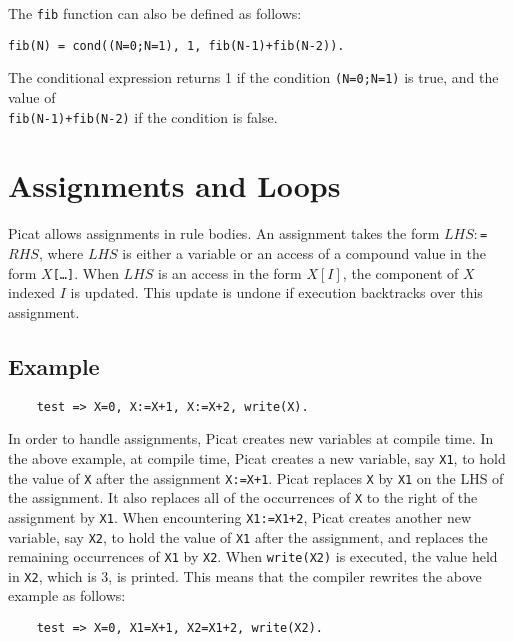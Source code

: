 The \texttt{fib} function can also be defined as follows:
\begin{verbatim}
fib(N) = cond((N=0;N=1), 1, fib(N-1)+fib(N-2)).
\end{verbatim}
The conditional expression returns 1 if the condition \texttt{(N=0;N=1)} is true, and the value of \\ \texttt{fib(N-1)+fib(N-2)} if the condition is false.

\section{Assignments and Loops}
Picat allows assignments in rule bodies. An assignment takes the form $LHS $$:$\verb+=+$ RHS$, where $LHS$ is either a variable or an access of a compound value in the form \texttt{$X$[\ldots]}. When $LHS$ is an access in the form $X[I]$, the component of $X$ indexed $I$ is updated. This update is undone if execution backtracks over this assignment.

\subsection*{Example}
\begin{verbatim}
    test => X=0, X:=X+1, X:=X+2, write(X).
\end{verbatim}

In order to handle assignments, Picat creates new variables at compile time.  In the above example, at compile time, Picat creates a new variable, say \texttt{X1}, to hold the value of \texttt{X} after the assignment \verb-X:=X+1-. Picat replaces \texttt{X} by \texttt{X1} on the LHS of the assignment.  It also replaces all of the occurrences of \texttt{X} to the right of the assignment by \texttt{X1}.  When encountering \verb-X1:=X1+2-, Picat creates another new variable, say \texttt{X2}, to hold the value of \texttt{X1} after the assignment, and replaces the remaining occurrences of \texttt{X1} by \texttt{X2}. When \texttt{write(X2)} is executed, the value held in \texttt{X2}, which is 3, is printed.  This means that the compiler rewrites the above example as follows:
\begin{verbatim}
    test => X=0, X1=X+1, X2=X1+2, write(X2).
\end{verbatim}


